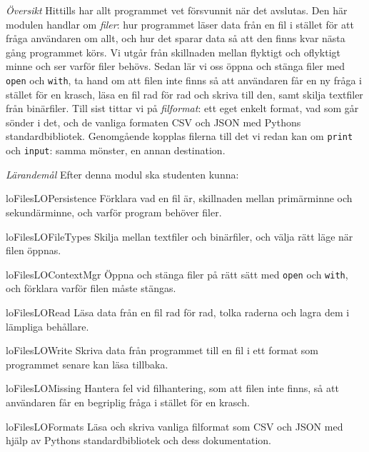 \emph{Översikt}
Hittills har allt programmet vet försvunnit när det avslutas.  Den här
modulen handlar om \emph{filer}: hur programmet läser data från en fil i
stället för att fråga användaren om allt, och hur det sparar data så att
den finns kvar nästa gång programmet körs.  Vi utgår från skillnaden
mellan flyktigt och oflyktigt minne och ser varför filer behövs.  Sedan
lär vi oss öppna och stänga filer med \texttt{open} och
\texttt{with}, ta hand om att filen inte finns så att
användaren får en ny fråga i stället för en krasch, läsa en fil rad för
rad och skriva till den, samt skilja textfiler från binärfiler.  Till
sist tittar vi på \emph{filformat}: ett eget enkelt format, vad som går sönder
i det, och de vanliga formaten CSV och JSON med Pythons
standardbibliotek.
Genomgående kopplas filerna till det vi redan kan om
\texttt{print} och \texttt{input}: samma
mönster, en annan destination.

\emph{Lärandemål}
Efter denna modul ska studenten kunna:
\begin{restatable}{lo}{FilesLOPersistence}\label{FilesLOPersistence}%
  Förklara vad en fil är, skillnaden mellan primärminne och
  sekundärminne, och varför program behöver filer.
\end{restatable}
\begin{restatable}{lo}{FilesLOFileTypes}\label{FilesLOFileTypes}%
  Skilja mellan textfiler och binärfiler, och välja rätt läge när filen
  öppnas.
\end{restatable}
\begin{restatable}{lo}{FilesLOContextMgr}\label{FilesLOContextMgr}%
  Öppna och stänga filer på rätt sätt med \texttt{open} och
  \texttt{with}, och förklara varför filen måste stängas.
\end{restatable}
\begin{restatable}{lo}{FilesLORead}\label{FilesLORead}%
  Läsa data från en fil rad för rad, tolka raderna och lagra dem i
  lämpliga behållare.
\end{restatable}
\begin{restatable}{lo}{FilesLOWrite}\label{FilesLOWrite}%
  Skriva data från programmet till en fil i ett format som programmet
  senare kan läsa tillbaka.
\end{restatable}
\begin{restatable}{lo}{FilesLOMissing}\label{FilesLOMissing}%
  Hantera fel vid filhantering, som att filen inte finns, så att
  användaren får en begriplig fråga i stället för en krasch.
\end{restatable}
\begin{restatable}{lo}{FilesLOFormats}\label{FilesLOFormats}%
  Läsa och skriva vanliga filformat som CSV och JSON med hjälp av
  Pythons standardbibliotek och dess dokumentation.
\end{restatable}

